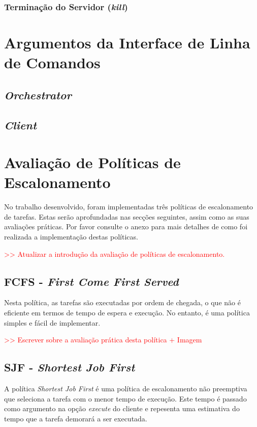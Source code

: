 \documentclass[a4paper,11pt]{scrreprt}
\begin{document}
        \subsection{Terminação do Servidor (\textit{kill})}

\chapter{Argumentos da Interface de Linha de Comandos}
    \section{\textit{Orchestrator}}
    \section{\textit{Client}}

\chapter{Avaliação de Políticas de Escalonamento}
    No trabalho desenvolvido, foram implementadas três políticas de escalonamento de tarefas.
    Estas serão aprofundadas nas secções seguintes, assim como as suas avaliações práticas.
    Por favor consulte o anexo  para mais detalhes de como foi realizada
    a implementação destas políticas.

    \textcolor{red}{>> Atualizar a introdução da avaliação de políticas de escalonamento.}
    \section{\textbf{FCFS} - \textit{First Come First Served}}
        Nesta política, as tarefas são executadas por ordem de chegada, o que não é
        eficiente em termos de tempo de espera e execução. No entanto, é uma política
        simples e fácil de implementar.

        \textcolor{red}{>> Escrever sobre a avaliação prática desta política + Imagem}
    \section{\textbf{SJF} - \textit{Shortest Job First}}
        A política \textit{Shortest Job First} é uma política de escalonamento não preemptiva
        que seleciona a tarefa com o menor tempo de execução. Este tempo é passado como
        argumento na opção \textit{execute} do cliente e repesenta uma estimativa do tempo
        que a tarefa demorará a ser executada.
\end{document}
